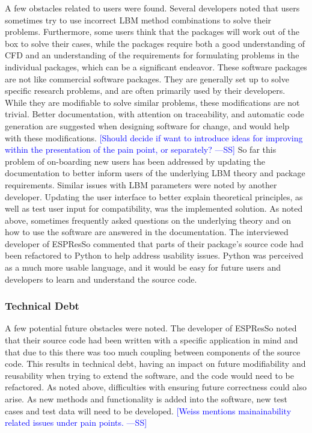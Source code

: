 \documentclass[final, 3p, times, authoryear]{elsarticle}
\newcommand{\authornote}[3]{\textcolor{#1}{[#3 ---#2]}}
\newcommand{\authornote}[3]{}
\newcommand{\wss}[1]{\authornote{blue}{SS}{#1}} %
\begin{document}
A few obstacles related to users were found. Several developers noted that users
sometimes try to use incorrect LBM method combinations to solve their problems.
Furthermore, some users think that the packages will work out of the box to
solve their cases, while the packages require both a good understanding of CFD
and an understanding of the requirements for formulating problems in the
individual packages, which can be a significant endeavor. These software
packages are not like commercial software packages. They are generally set up to
solve specific research problems, and are often primarily used by their
developers. While they are modifiable to solve similar problems, these
modifications are not trivial. Better documentation, with attention on
traceability, and automatic code generation are suggested when designing
software for change, and would help with these modifications. \wss{Should decide
if want to introduce ideas for improving within the presentation of the pain
point, or separately?}  So far this problem of on-boarding new users has been
addressed by updating the documentation to better inform users of the underlying
LBM theory and package requirements. Similar issues with LBM parameters were
noted by another developer. Updating the user interface to better explain
theoretical principles, as well as test user input for compatibility, was the
implemented solution. As noted above, sometimes frequently asked questions on
the underlying theory and on how to use the software are answered in the
documentation.  The interviewed developer of ESPResSo commented that parts of
their package's source code had been refactored to Python to help address
usability issues. Python was perceived as a much more usable language, and it
would be easy for future users and developers to learn and understand the source
code. 

\subsubsection{Technical Debt}

A few potential future obstacles were noted. The developer of ESPResSo noted
that their source code had been written with a specific application in mind and
that due to this there was too much coupling between components of the source
code. This results in technical debt, having an impact on future modifiability
and reusability when trying to extend the software, and the code would need to
be refactored.  As noted above, difficulties with ensuring future correctness
could also arise. As new methods and functionality is added into the software,
new test cases and test data will need to be developed.  \wss{Weiss mentions
mainainability related issues under pain points.}
\end{document}
